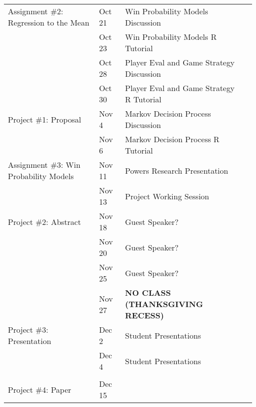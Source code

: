 \documentclass[11pt]{article}
\begin{document}
\begin{adjustwidth}{1cm}{0cm}
\begin{center}
\begin{tabular}{llll}
      \hline
      Assignment \#2: Regression to the Mean    & Oct 21  & Win Probability Models Discussion\\
                                                & Oct 23  & Win Probability Models R Tutorial\\
      \hline
                                                & Oct 28  & Player Eval and Game Strategy Discussion\\
                                                & Oct 30  & Player Eval and Game Strategy R Tutorial\\
      \hline
      Project \#1: Proposal                     & Nov 4   & Markov Decision Process Discussion\\
                                                & Nov 6   & Markov Decision Process R Tutorial\\
      \hline
      Assignment \#3: Win Probability Models    & Nov 11  & Powers Research Presentation\\
                                                & Nov 13  & Project Working Session\\
      \hline
      Project \#2: Abstract                     & Nov 18  & Guest Speaker?\\
                                                & Nov 20  & Guest Speaker?\\
      \hline
                                                & Nov 25  & Guest Speaker?\\
                                                & Nov 27  & {\bf NO CLASS (THANKSGIVING RECESS)}\\
      \hline
      Project \#3: Presentation                 & Dec 2   & Student Presentations\\
                                                & Dec 4   & Student Presentations\\
      \hline
      \\
      Project \#4: Paper                        & Dec 15  & \\
    \end{tabular}
  \end{center}
\end{adjustwidth}
\end{document}
